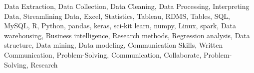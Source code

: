 Data Extraction, Data Collection, Data Cleaning, Data Processing, Interpreting Data, Streamlining Data, Excel, Statistics, Tableau, RDMS, Tables, SQL, MySQL, R, Python, pandas, keras, sci-kit learn, numpy, Linux, spark, Data warehousing, Business intelligence, Research methods, Regression analysis, Data structure, Data mining, Data modeling, Communication Skills, Written Communication, Problem-Solving, Communication, Collaborate, Problem-Solving, Research	